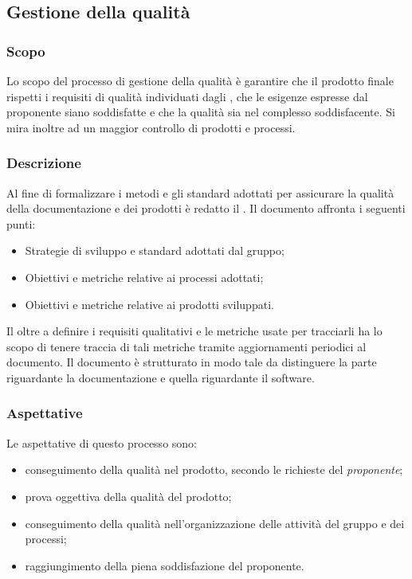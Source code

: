 \subsection{Gestione della qualità}
\subsubsection{Scopo}
Lo scopo del processo di gestione della qualità è garantire che il prodotto finale rispetti i requisiti di qualità individuati dagli , che le esigenze espresse dal proponente siano soddisfatte e che la qualità sia nel complesso soddisfacente. Si mira inoltre ad un maggior controllo di prodotti e processi.
\subsubsection{Descrizione}
Al fine di formalizzare i metodi e gli standard adottati per assicurare la qualità della documentazione e dei prodotti è redatto il \PdQ{}.
Il documento affronta i seguenti punti:
\begin{itemize}
\item Strategie di sviluppo e standard adottati dal gruppo;
\item Obiettivi e metriche relative ai processi adottati;
\item Obiettivi e metriche relative ai prodotti sviluppati.
\end{itemize}
Il \PdQ{} oltre a definire i requisiti qualitativi e le metriche usate per tracciarli ha lo scopo di tenere traccia di tali metriche tramite aggiornamenti periodici al documento.
Il documento è strutturato in modo tale da distinguere la parte riguardante la documentazione e quella riguardante il software.
\subsubsection{Aspettative}
Le aspettative di questo processo sono:
\begin{itemize}
	\item conseguimento della qualità nel prodotto, secondo le richieste del \textit{proponente};
	\item prova oggettiva della qualità del prodotto;
	\item conseguimento della qualità nell'organizzazione delle attività del gruppo e dei processi;
	\item raggiungimento della piena soddisfazione del proponente.
\end{itemize}
